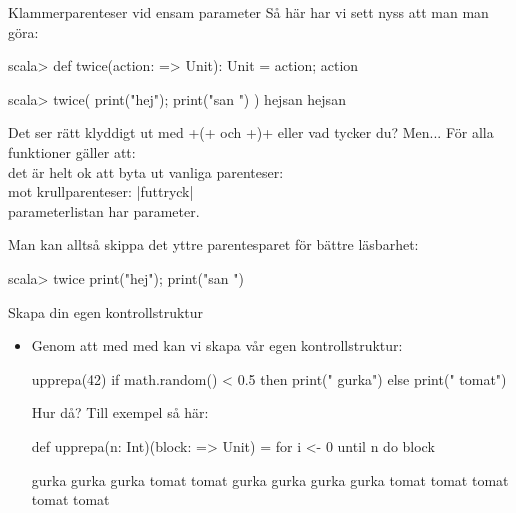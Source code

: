 \begin{Slide}{Klammerparenteser vid ensam parameter}
	Så här har vi sett nyss att man man göra:
	\begin{REPL}
		scala> def twice(action: => Unit): Unit = { action; action }

		scala> twice( { print("hej"); print("san ") } )
		hejsan hejsan
	\end{REPL}

	Det ser rätt klyddigt ut med \code+{(+  och \code+)}+ eller vad tycker du? \pause Men...
	För alla funktioner  gäller att: \\ det är helt ok att byta ut vanliga parenteser: \hfill{} \\ mot krullparenteser: \hfill\code|f{uttryck}| \\  parameterlistan har  parameter.

	\vspace{0.5em}Man kan alltså skippa det yttre parentesparet för bättre läsbarhet:
	\begin{REPLnonum}
		scala> twice { print("hej"); print("san ") }
	\end{REPLnonum}
\end{Slide}

\begin{Slide}{Skapa din egen kontrollstruktur}
	\begin{itemize}
		\item Genom att   med  med  kan vi skapa vår egen kontrollstruktur:  \pause
		      \begin{Code}
			      upprepa(42){
					      if math.random() < 0.5 then print(" gurka")
					      else print(" tomat")
				      }
		      \end{Code}
		      Hur då?
		      \pause
		      Till exempel så här:
		      \begin{Code}
			      def upprepa(n: Int)(block: => Unit) =
			      for i <- 0 until n do block
		      \end{Code}

		      \pause

		      \begin{REPLnonum}
			      gurka gurka gurka tomat tomat gurka gurka gurka gurka tomat tomat tomat tomat tomat
		      \end{REPLnonum}
	\end{itemize}
\end{Slide}

